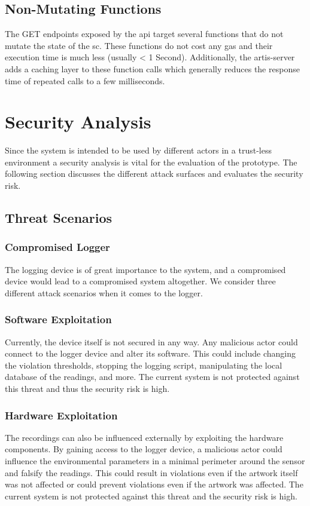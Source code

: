 \subsection*{Non-Mutating Functions}
The GET endpoints exposed by the \gls{api} target several functions that do not mutate the state of the \gls{sc}. These functions do not cost any gas and their execution time is much less (usually < 1 Second). Additionally, the artis-server adds a caching layer to these function calls which generally reduces the response time of repeated calls to a few milliseconds.

\section{Security Analysis}
\label{sec:security_analysis}
Since the system is intended to be used by different actors in a trust-less environment a security analysis is vital for the evaluation of the prototype. The following section discusses the different attack surfaces and evaluates the security risk.

\subsection{Threat Scenarios}

\subsubsection{Compromised Logger}
The logging device is of great importance to the system, and a compromised device would lead to a compromised system altogether. We consider three different attack scenarios when it comes to the logger.
\subsubsection{Software Exploitation}
Currently, the device itself is not secured in any way. Any malicious actor could connect to the logger device and alter its software. This could include changing the violation thresholds, stopping the logging script, manipulating the local database of the readings, and more. The current system is not protected against this threat and thus the security risk is high.
\subsubsection{Hardware Exploitation}
The recordings can also be influenced externally by exploiting the hardware components. By gaining access to the logger device, a malicious actor could influence the environmental parameters in a minimal perimeter around the sensor and falsify the readings. This could result in violations even if the artwork itself was not affected or could prevent violations even if the artwork was affected. The current system is not protected against this threat and the security risk is high.
